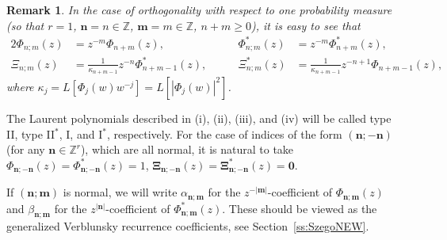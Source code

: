 \documentclass[reqno,centertags,11pt,draft]{amsart}
\newtheorem{rem}[thm]{Remark}
\newcommand{\Z}{\mathbb{Z}}
\newcommand{\abs}[1]{\left|#1\right|}
\begin{document}
\begin{rem}\label{rem:r=1} 
In the case of orthogonality with respect to  one probability measure   (so that $r=1$, $\bm{n} = n \in \Z$, $\bm{m} = m \in \Z$, $n+m\ge0$), it is easy to see that 
\begin{alignat*}{2}
    \Phi_{n;m}(z) &= z^{-m}\Phi_{n+m}(z), \qquad  &\Phi_{n;m}^*(z) &= z^{-m}\Phi^*_{n+m}(z),
    \\
    {\Xi}_{n;m}(z) & = \tfrac{1}{\kappa_{n+m-1}} z^{-n}\Phi^*_{n+m-1}(z),
    \qquad 
    &{\Xi}^*_{n;m}(z) &= \tfrac{1}{\kappa_{n+m-1}} z^{-n+1} \Phi_{n+m-1}(z),
\end{alignat*}
where $\kappa_j = L[\Phi_j(w)w^{-j}] = L[|\Phi_j(w)|^2]$. 
\end{rem}

The Laurent polynomials described in   (i), (ii),  (iii), and (iv) will be called type II, type II$^*$, I, and I$^*$, respectively. For the case of indices of the form $(\bm{n};-\bm{n})$ (for any $\bm{n}\in\Z^r$), which are all normal, it is natural to take $\Phi_{\bm{n};-\bm{n}}(z) = \Phi^*_{\bm{n};-\bm{n}}(z) = 1$, $\bm{\Xi}_{\bm{n};-\bm{n}}(z) = \bm{\Xi}^*_{\bm{n};-\bm{n}}(z) = \bm{0}$. %

If $(\bm{n};\bm{m})$ is normal, we will write $\alpha_{\bm{n};\bm{m}}$ for the $z^{-\abs{\bm{m}}}$-coefficient of $\Phi_{\bm{n};\bm{m}}(z)$ and $\beta_{\bm{n};\bm{m}}$ for the $z^{\abs{\bm{n}}}$-coefficient of $\Phi_{\bm{n};\bm{m}}^*(z)$. These should be viewed as the generalized Verblunsky %
recurrence coefficients, see Section~\ref{ss:SzegoNEW}.


\end{document}
